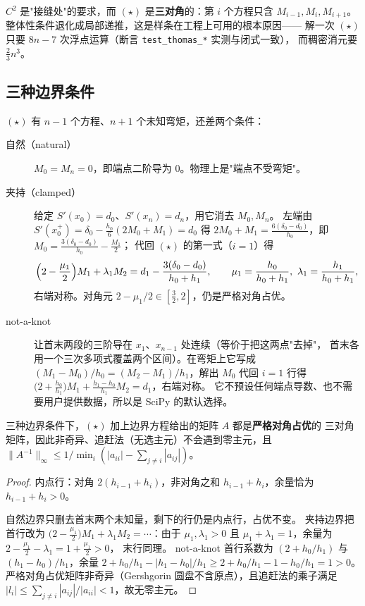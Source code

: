 \begin{remark}
$C^2$ 是"接缝处"的要求，而 $(\star)$ 是\textbf{三对角}的：第 $i$ 个方程只含
$M_{i-1},M_i,M_{i+1}$。整体性条件退化成局部递推，这是样条在工程上可用的根本原因——
解一次 $(\star)$ 只要 $8n-7$ 次浮点运算（断言 \texttt{test\_thomas\_*} 实测与闭式一致），
而稠密消元要 $\tfrac23n^3$。
\end{remark}

\subsection{三种边界条件}

$(\star)$ 有 $n-1$ 个方程、$n+1$ 个未知弯矩，还差两个条件：

\begin{description}
  \item[自然（natural）] $M_0=M_n=0$，即端点二阶导为 0。物理上是"端点不受弯矩"。
  \item[夹持（clamped）] 给定 $S'(x_0)=d_0$、$S'(x_n)=d_n$，用它消去 $M_0,M_n$。
        左端由 $S'(x_0^+)=\delta_0-\frac{h_0}{6}(2M_0+M_1)=d_0$ 得
        $2M_0+M_1=\frac{6(\delta_0-d_0)}{h_0}$，即 $M_0=\frac{3(\delta_0-d_0)}{h_0}-\frac{M_1}{2}$；
        代回 $(\star)$ 的第一式（$i=1$）得
        \[
        \Bigl(2-\frac{\mu_1}{2}\Bigr)M_1+\lambda_1M_2
        =d_1-\frac{3(\delta_0-d_0)}{h_0+h_1},
        \qquad \mu_1=\frac{h_0}{h_0+h_1},\ \lambda_1=\frac{h_1}{h_0+h_1},
        \]
        右端对称。对角元 $2-\mu_1/2\in[\tfrac32,2]$，仍是严格对角占优。
  \item[not-a-knot] 让首末两段的三阶导在 $x_1$、$x_{n-1}$ 处连续（等价于把这两点"去掉"，
        首末各用一个三次多项式覆盖两个区间）。在弯矩上它写成
        $(M_1-M_0)/h_0=(M_2-M_1)/h_1$，解出 $M_0$ 代回 $i=1$ 行得
        $\bigl(2+\frac{h_0}{h_1}\bigr)M_1+\frac{h_1-h_0}{h_1}M_2=d_1$，右端对称。
        它不预设任何端点导数、也不需要用户提供数据，所以是 SciPy 的默认选择。
\end{description}

\begin{theorem}[存在唯一性与对角占优]
\label{thm:dominant}
三种边界条件下，$(\star)$ 加上边界方程给出的矩阵 $A$ 都是\textbf{严格对角占优}的
三对角矩阵，因此非奇异、追赶法（无选主元）不会遇到零主元，且
$\|A^{-1}\|_\infty\le 1/\min_i(|a_{ii}|-\sum_{j\ne i}|a_{ij}|)$。
\end{theorem}

\begin{proof}
内点行：对角 $2(h_{i-1}+h_i)$，非对角之和 $h_{i-1}+h_i$，余量恰为 $h_{i-1}+h_i>0$。

自然边界只删去首末两个未知量，剩下的行仍是内点行，占优不变。
夹持边界把首行改为 $\bigl(2-\frac{\mu_1}{2}\bigr)M_1+\lambda_1M_2=\cdots$：由于
$\mu_1,\lambda_1>0$ 且 $\mu_1+\lambda_1=1$，余量为 $2-\frac{\mu_1}{2}-\lambda_1=1+\frac{\mu_1}{2}>0$，
末行同理。
not-a-knot 首行系数为 $(2+h_0/h_1)$ 与 $(h_1-h_0)/h_1$，余量
$2+h_0/h_1-|h_1-h_0|/h_1\ge 2+h_0/h_1-1-h_0/h_1=1>0$。
严格对角占优矩阵非奇异（Gershgorin 圆盘不含原点），且追赶法的乘子满足
$|l_i|\le \sum_{j\ne i}|a_{ij}|/|a_{ii}|<1$，故无零主元。
\end{proof}

